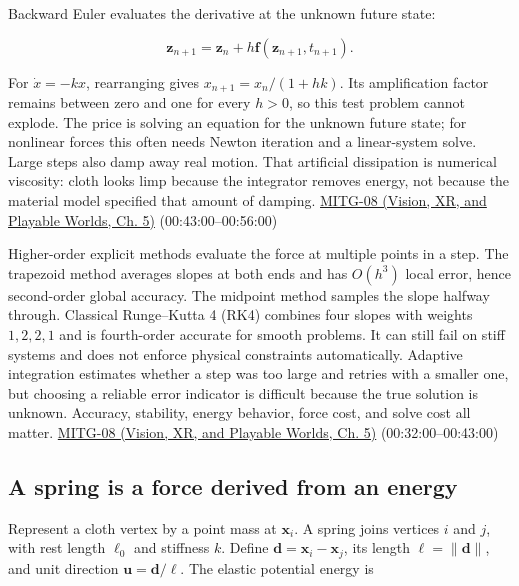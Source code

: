 Backward Euler evaluates the derivative at the unknown future state:

\[
\boldsymbol{z}_{n+1}=\boldsymbol{z}_n+h\boldsymbol{f}(\boldsymbol{z}_{n+1},t_{n+1}).
\]

For \(\dot{x}=-kx\), rearranging gives \(x_{n+1}=x_n/(1+hk)\). Its amplification factor remains between zero and one for every \(h>0\), so this test problem cannot explode. The price is solving an equation for the unknown future state; for nonlinear forces this often needs Newton iteration and a linear-system solve. Large steps also damp away real motion. That artificial dissipation is numerical viscosity: cloth looks limp because the integrator removes energy, not because the material model specified that amount of damping. \href{../07-Vision-XR-and-Playable-Worlds/main.pdf\#nameddest=04-visual-computing-ii-ch036-mitg-08---cloth-simulation}{MITG-08 (Vision, XR, and Playable Worlds, Ch. 5)} (00:43:00--00:56:00)

Higher-order explicit methods evaluate the force at multiple points in a step. The trapezoid method averages slopes at both ends and has \(O(h^3)\) local error, hence second-order global accuracy. The midpoint method samples the slope halfway through. Classical Runge--Kutta 4 (RK4) combines four slopes with weights \(1,2,2,1\) and is fourth-order accurate for smooth problems. It can still fail on stiff systems and does not enforce physical constraints automatically. Adaptive integration estimates whether a step was too large and retries with a smaller one, but choosing a reliable error indicator is difficult because the true solution is unknown. Accuracy, stability, energy behavior, force cost, and solve cost all matter. \href{../07-Vision-XR-and-Playable-Worlds/main.pdf\#nameddest=04-visual-computing-ii-ch036-mitg-08---cloth-simulation}{MITG-08 (Vision, XR, and Playable Worlds, Ch. 5)} (00:32:00--00:43:00)

\subsection{A spring is a force derived from an energy}\label{04-visual-computing-ii-ch029-a-spring-is-a-force-derived-from-an-energy}

Represent a cloth vertex by a point mass at \(\boldsymbol{x}_i\). A spring joins vertices \(i\) and \(j\), with rest length \(\ell_0\) and stiffness \(k\). Define \(\boldsymbol{d}=\boldsymbol{x}_i-\boldsymbol{x}_j\), its length \(\ell=\|\boldsymbol{d}\|\), and unit direction \(\boldsymbol{u}=\boldsymbol{d}/\ell\). The elastic potential energy is


